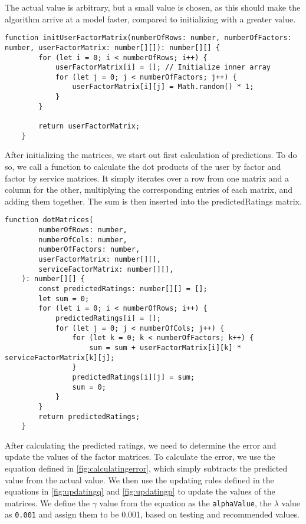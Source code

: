 The actual value is arbitrary, but a small value is chosen, as this should make the algorithm arrive at a model faster, compared to initializing with a greater value.
\begin{lstlisting}[caption={Initializing the user and factor matrix}, captionpos=b, label={lst:initUserFactor}]
    function initUserFactorMatrix(numberOfRows: number, numberOfFactors: number, userFactorMatrix: number[][]): number[][] {
        for (let i = 0; i < numberOfRows; i++) {
            userFactorMatrix[i] = []; // Initialize inner array
            for (let j = 0; j < numberOfFactors; j++) {
                userFactorMatrix[i][j] = Math.random() * 1;
            }
        }
    
        return userFactorMatrix;
    }
\end{lstlisting}
After initializing the matrices, we start out first calculation of predictions.
To do so, we call a function to calculate the dot products of the user by factor and factor by service matrices.
It simply iterates over a row from one matrix and a column for the other, multiplying the corresponding entries of each matrix, and adding them together.
The sum is then inserted into the predictedRatings matrix.
\begin{lstlisting}[caption={}, captionpos=b, label={}]
    function dotMatrices(
        numberOfRows: number,
        numberOfCols: number,
        numberOfFactors: number,
        userFactorMatrix: number[][],
        serviceFactorMatrix: number[][],
    ): number[][] {
        const predictedRatings: number[][] = [];
        let sum = 0;
        for (let i = 0; i < numberOfRows; i++) {
            predictedRatings[i] = [];
            for (let j = 0; j < numberOfCols; j++) {
                for (let k = 0; k < numberOfFactors; k++) {
                    sum = sum + userFactorMatrix[i][k] * serviceFactorMatrix[k][j];
                }
                predictedRatings[i][j] = sum;
                sum = 0;
            }
        } 
        return predictedRatings;
    }
\end{lstlisting}
After calculating the predicted ratings, we need to determine the error and update the values of the factor matrices.
To calculate the error, we use the equation defined in \autoref{fig:calculatingerror}, which simply subtracts the predicted value from the actual value.
We then use the updating rules defined in the equations in \autoref{fig:updatingq} and \autoref{fig:updatingp} to update the values of the matrices.
We define the $\gamma$ value from the equation as the \texttt{alphaValue}, the $\lambda$ value as \texttt{0.001} and assign them to be 0.001, based on testing and recommended values.

